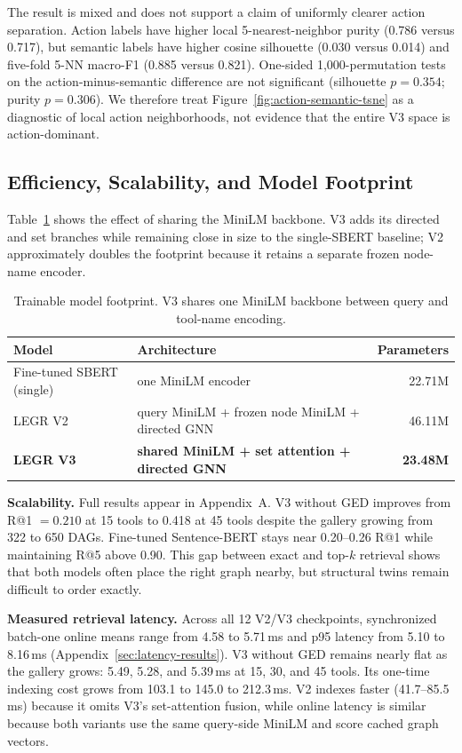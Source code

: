 \documentclass{article}
\begin{document}
The result is mixed and does not support a claim of uniformly clearer action separation. Action labels have higher local 5-nearest-neighbor purity (0.786 versus 0.717), but semantic labels have higher cosine silhouette (0.030 versus 0.014) and five-fold 5-NN macro-F1 (0.885 versus 0.821). One-sided 1,000-permutation tests on the action-minus-semantic difference are not significant (silhouette $p=0.354$; purity $p=0.306$). We therefore treat Figure~\ref{fig:action-semantic-tsne} as a diagnostic of local action neighborhoods, not evidence that the entire V3 space is action-dominant.

\subsection{Efficiency, Scalability, and Model Footprint}
\label{sec:results-scale}
Table~\ref{tab:model_size} shows the effect of sharing the MiniLM backbone. V3 adds its directed and set branches while remaining close in size to the single-SBERT baseline; V2 approximately doubles the footprint because it retains a separate frozen node-name encoder.

\begin{table}[h]
\caption{Trainable model footprint. V3 shares one MiniLM backbone between query and tool-name encoding.}
\label{tab:model_size}
\centering
\small
\begin{tabular}{@{}llr@{}}
\toprule
Model & Architecture & Parameters \\
\midrule
Fine-tuned SBERT (single) & one MiniLM encoder & 22.71M \\
LEGR V2 & query MiniLM + frozen node MiniLM + directed GNN & 46.11M \\
\textbf{LEGR V3} & \textbf{shared MiniLM + set attention + directed GNN} & \textbf{23.48M} \\
\bottomrule
\end{tabular}
\end{table}

\textbf{Scalability.} Full results appear in Appendix~A. V3 without GED improves from R@1 $=0.210$ at 15 tools to 0.418 at 45 tools despite the gallery growing from 322 to 650 DAGs. Fine-tuned Sentence-BERT stays near 0.20--0.26 R@1 while maintaining R@5 above 0.90. This gap between exact and top-$k$ retrieval shows that both models often place the right graph nearby, but structural twins remain difficult to order exactly.

\textbf{Measured retrieval latency.} Across all 12 V2/V3 checkpoints, synchronized batch-one online means range from 4.58 to 5.71\,ms and p95 latency from 5.10 to 8.16\,ms (Appendix~\ref{sec:latency-results}). V3 without GED remains nearly flat as the gallery grows: 5.49, 5.28, and 5.39\,ms at 15, 30, and 45 tools. Its one-time indexing cost grows from 103.1 to 145.0 to 212.3\,ms. V2 indexes faster (41.7--85.5\,ms) because it omits V3's set-attention fusion, while online latency is similar because both variants use the same query-side MiniLM and score cached graph vectors.
\end{document}
